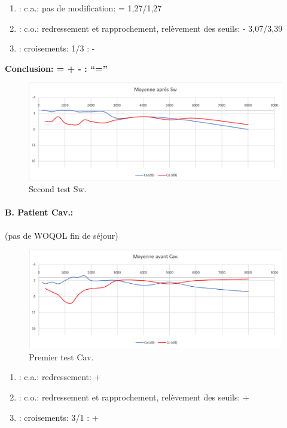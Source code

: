 	\begin{enumerate}
 		
 		\item : c.a.: pas de modification: =   1,27/1,27
                
 		\item : c.o.: redressement et rapprochement,
                  relèvement des seuils: -         3,07/3,39
 		\item : croisements: 1/3 :  -
                  
                \end{enumerate}

                \textbf{  Conclusion:  = +  -        : ``=''}

                \begin{figure}
\centering
\includegraphics[width=0.7\linewidth]{images/graphiques/sw_post.png}
\caption[Moyenne OG+OD]{Second test Sw.}
       
\label{groupecontroleimage1}
\end{figure}




\paragraph{B. Patient Cav.: }

(pas de WOQOL fin de séjour)


\begin{figure}[th]
\centering
\includegraphics[width=0.7\linewidth]{images/graphiques/cav_pre.png}
\caption[Moyenne OG+OD]{Premier test Cav.}
       
\label{groupecontroleimage1}
\end{figure}

	\begin{enumerate}
 		
 		\item : c.a.: redressement: +
                
 		\item : c.o.: redressement et rapprochement, relèvement des seuils: +
 		\item : croisements: 3/1 :  +
                  
                \end{enumerate}

